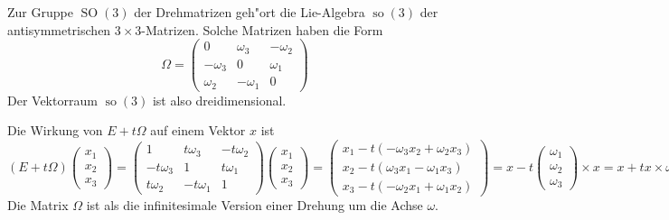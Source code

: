 \begin{beispiel}
Zur Gruppe $\operatorname{SO}(3)$ der Drehmatrizen geh"ort die Lie-Algebra
$\operatorname{so}(3)$ der antisymmetrischen $3\times 3$-Matrizen.
Solche Matrizen haben die Form
\[
\Omega
=
\begin{pmatrix}
    0    & \omega_3&-\omega_2\\
-\omega_3&   0     & \omega_1\\
 \omega_2&-\omega_1&    0
\end{pmatrix}
\]
Der Vektorraum $\operatorname{so}(3)$ ist also dreidimensional.

Die Wirkung von $E+t\Omega$ auf einem Vektor $x$ ist
\[
(E+t\Omega)
\begin{pmatrix}x_1\\x_2\\x_3\end{pmatrix}
=
\begin{pmatrix}
    1     & t\omega_3&-t\omega_2\\
-t\omega_3&   1      & t\omega_1\\
 t\omega_2&-t\omega_1&    1
\end{pmatrix}
\begin{pmatrix}x_1\\x_2\\x_3\end{pmatrix}
=
\begin{pmatrix}
x_1-t(-\omega_3x_2+\omega_2x_3)\\
x_2-t( \omega_3x_1-\omega_1x_3)\\
x_3-t(-\omega_2x_1+\omega_1x_2)
\end{pmatrix}
=
x- t\begin{pmatrix}\omega_1\\\omega_2\\\omega_3\end{pmatrix}\times x
=
x+ tx\times \omega.
\]
Die Matrix $\Omega$ ist als die infinitesimale Version einer Drehung
um die Achse $\omega$.


\end{beispiel}
